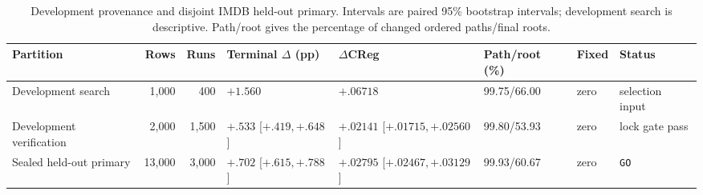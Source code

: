 \begin{table}[H]
\centering
\caption{Development provenance and disjoint IMDB held-out primary. Intervals are paired 95\% bootstrap intervals; development search is descriptive. Path/root gives the percentage of changed ordered paths/final roots.}
\label{tab:step104-imdb}
\scriptsize
\setlength{\tabcolsep}{1.5pt}
\begin{tabular}{@{}lrrlllll@{}}
\toprule
Partition & Rows & Runs & Terminal $\Delta$ (pp) & $\Delta$CReg & Path/root (\%) & Fixed & Status \\
\midrule
Development search & 1,000 & 400 & $+1.560$ & $+.06718$ & 99.75/66.00 & zero & selection input \\
Development verification & 2,000 & 1,500 & $+.533$ [$+.419,+.648$] & $+.02141$ [$+.01715,+.02560$] & 99.80/53.93 & zero & lock gate pass \\
Sealed held-out primary & 13,000 & 3,000 & $+.702$ [$+.615,+.788$] & $+.02795$ [$+.02467,+.03129$] & 99.93/60.67 & zero & \texttt{GO} \\
\bottomrule
\end{tabular}
\end{table}
